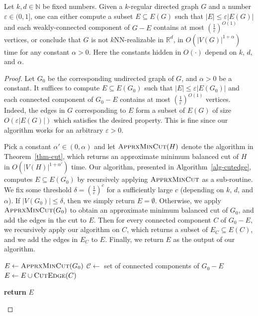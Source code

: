 \documentclass[english]{lipics-v2021}
\begin{document}
\begin{lemma} \label{lem-edgeremoval}
Let $k, d \in \mathbb{N}$ be fixed numbers.
Given a $k$-regular directed graph $G$ and a number $\varepsilon \in (0,1]$, one can either compute a subset $E \subseteq E(G)$ such that $|E| \leq \varepsilon |E(G)|$ and each weakly-connected component of $G - E$ contains at most $(\frac{1}{\varepsilon})^{O(1)}$ vertices, or conclude that $G$ is not $k$NN-realizable in $\mathbb{R}^d$, in $O(|V(G)|^{1+\alpha})$ time for any constant $\alpha > 0$.
Here the constants hidden in $O(\cdot)$ depend on $k$, $d$, and $\alpha$.
\end{lemma}
\begin{proof}
Let $G_0$ be the corresponding undirected graph of $G$, and $\alpha > 0$ be a constant.
It suffices to compute $E \subseteq E(G_0)$ such that $|E| \leq \varepsilon |E(G_0)|$ and each connected component of $G_0 - E$ contains at most $(\frac{1}{\varepsilon})^{O(1)}$ vertices.
Indeed, the edges in $G$ corresponding to $E$ form a subset of $E(G)$ of size $O(\varepsilon |E(G)|)$ which satisfies the desired property.
This is fine since our algorithm works for an arbitrary $\varepsilon > 0$.

Pick a constant $\alpha' \in (0,\alpha)$ and let $\textsc{ApprxMinCut}(H)$ denote the algorithm in Theorem~\ref{thm-cut}, which returns an approximate minimum balanced cut of $H$ in $O(|V(H)|^{1+\alpha'})$ time.
Our algorithm, presented in Algorithm~\ref{alg-cutedge}, computes $E \subseteq E(G_0)$ by recursively applying $\textsc{ApprxMinCut}$ as a sub-routine.
We fix some threshold $\delta = (\frac{1}{\varepsilon})^c$ for a sufficiently large $c$ (depending on $k$, $d$, and $\alpha$).
If $|V(G_0)| \leq \delta$, then we simply return $E = \emptyset$.
Otherwise, we apply $\textsc{ApprxMinCut}(G_0)$ to obtain an approximate minimum balanced cut of $G_0$, and add the edges in the cut to $E$.
Then for every connected component $C$ of $G_0 - E$, we recursively apply our algorithm on $C$, which returns a subset of $E_C \subseteq E(C)$, and we add the edges in $E_C$ to $E$.
Finally, we return $E$ as the output of our algorithm.

\begin{algorithm}[htbp]
    \caption{\textsc{CutEdge}$(G_0)$}
    \begin{algorithmic}[1]
            \begin{nolinenumbers}
            \end{nolinenumbers}
        \EndIf
        \State $E \leftarrow \textsc{ApprxMinCut}(G_0)$
        \State $\mathcal{C} \leftarrow$ set of connected components of $G_0 - E$
            \State $E \leftarrow E \cup \textsc{CutEdge}(C)$
            \begin{nolinenumbers}
            \end{nolinenumbers}
        \EndFor
        \State \textbf{return} $E$
    \end{algorithmic}
    \label{alg-cutedge}
\end{algorithm}


\end{proof}
\end{document}
